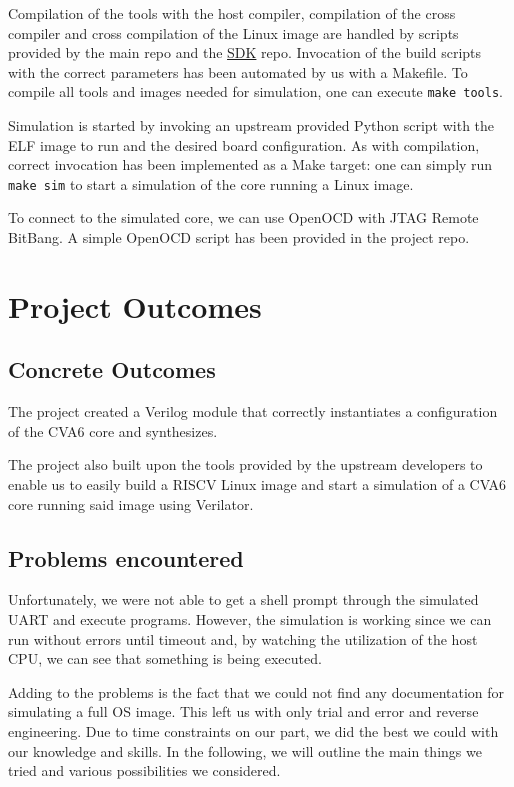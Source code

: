 \documentclass[a4paper,11pt]{article}
\begin{document}
Compilation of the tools with the host compiler, compilation of the cross
compiler and cross compilation of the Linux image are handled by scripts
provided by the main repo and the
\href{https://github.com/openhwgroup/cva6-sdk}{SDK} repo. Invocation of the
build scripts with the correct parameters has been automated by us with a
Makefile. To compile all tools and images needed for simulation, one can execute
\texttt{make tools}.

Simulation is started by invoking an upstream provided Python script with the
ELF image to run and the desired board configuration. As with compilation,
correct invocation has been implemented as a Make target: one can simply run
\texttt{make sim} to start a simulation of the core running a Linux image.

To connect to the simulated core, we can use OpenOCD with JTAG Remote BitBang.
A simple OpenOCD script has been provided in the project repo.

\section{Project Outcomes}

\subsection{Concrete Outcomes}

The project created a Verilog module that correctly instantiates a configuration
of the CVA6 core and synthesizes.

The project also built upon the tools provided by the upstream developers to
enable us to easily build a RISCV Linux image and start a simulation of a CVA6
core running said image using Verilator.

\subsection{Problems encountered}

Unfortunately, we were not able to get a shell prompt through the simulated UART
and execute programs. However, the simulation is working since we can run
without errors until timeout and, by watching the utilization of the host
CPU, we can see that something is being executed.

Adding to the problems is the fact that we could not find any documentation for
simulating a full OS image. This left us with only trial and error and reverse
engineering. Due to time constraints on our part, we did the best we could with
our knowledge and skills. In the following, we will outline the main things we
tried and various possibilities we considered.
\end{document}
